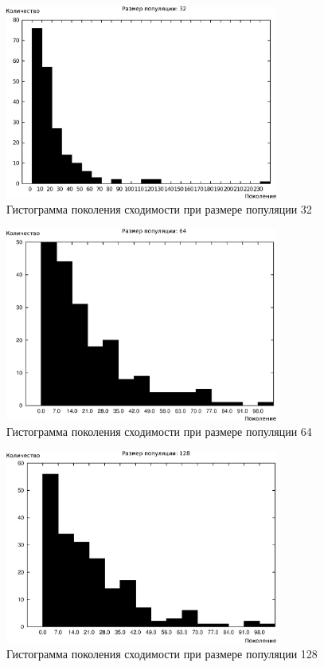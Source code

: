 \begin{figure}[h!]
\centering
\includegraphics[width=0.8\textwidth]{science/histogram32}
\caption{Гистограмма поколения сходимости при размере популяции 32}
\label{figure:histogram32}
\end{figure}

\begin{figure}[h!]
\centering
\includegraphics[width=0.8\textwidth]{science/histogram64}
\caption{Гистограмма поколения сходимости при размере популяции 64}
\label{figure:histogram64}
\end{figure}

\begin{figure}[h!]
\centering
\includegraphics[width=0.8\textwidth]{science/histogram128}
\caption{Гистограмма поколения сходимости при размере популяции 128}
\label{figure:histogram128}
\end{figure}

